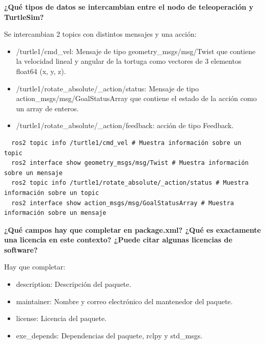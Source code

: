 \documentclass[a4paper,12pt]{article}
\begin{document}
{\vspace{1cm}


\textbf{¿Qué tipos de datos se intercambian entre el nodo de teleoperación y TurtleSim?}


\vspace{1cm}

Se intercambian 2 topics con distintos mensajes y una acción:

\vspace{0.5cm}

\begin{itemize}
    \item /turtle1/cmd\_vel: Mensaje de tipo geometry\_msgs/msg/Twist que contiene la velocidad lineal y 
    angular de la tortuga como vectores de 3 elementos float64 (x, y, z).
    \item /turtle1/rotate\_absolute/\_action/status: Mensaje de tipo action\_msgs/msg/GoalStatusArray que 
    contiene el estado de la acción como un array de enteros.
    \item /turtle1/rotate\_absolute/\_action/feedback: acción de tipo Feedback.
\end{itemize}

\vspace{0.5cm}

\begin{lstlisting}
  ros2 topic info /turtle1/cmd_vel # Muestra información sobre un topic
  ros2 interface show geometry_msgs/msg/Twist # Muestra información sobre un mensaje
  ros2 topic info /turtle1/rotate_absolute/_action/status # Muestra información sobre un topic
  ros2 interface show action_msgs/msg/GoalStatusArray # Muestra información sobre un mensaje
\end{lstlisting}

\vspace{1cm}


\textbf{¿Qué campos hay que completar en package.xml? ¿Qué es exactamente una licencia en este contexto? 
¿Puede citar algunas licencias de software?}


\vspace{1cm}

Hay que completar:

\vspace{0.5cm}

\begin{itemize}
  \item description: Descripción del paquete.
  \item maintainer: Nombre y correo electrónico del mantenedor del paquete.
  \item license: Licencia del paquete.
  \item exe\_depends: Dependencias del paquete, rclpy y std\_msgs. 
\end{itemize}

}
\end{document}
